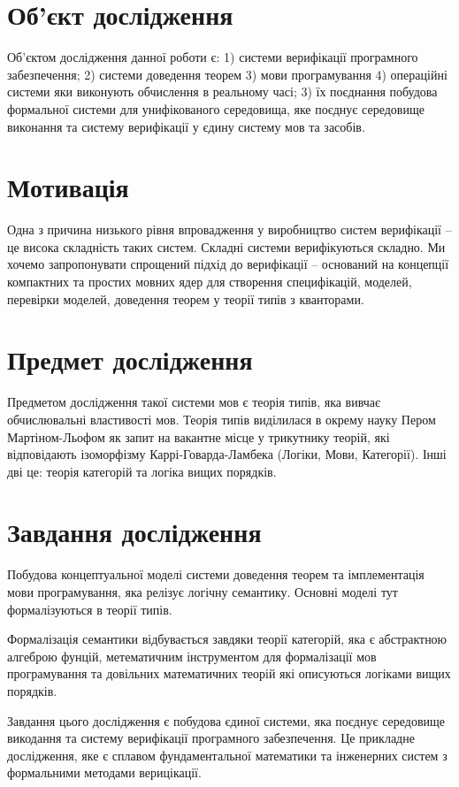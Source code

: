\section{Об'єкт дослідження}
Об'єктом дослідження данної роботи є: 1) системи верифікації
програмного забезпечення; 2) системи доведення теорем 3) мови програмування
4) операційні системи яки виконують
обчислення в реальному часі; 3) їх поєднання побудова формальної системи для
унифікованого середовища, яке поєднує середовище виконання та систему
верифікації у єдину систему мов та засобів.

\section{Мотивація}
Одна з причина низького рівня впровадження у виробництво систем
верифікації -- це висока складність таких систем. Складні системи
верифікуються складно. Ми хочемо запропонувати спрощений
підхід до верифікації -- оснований на концепції компактних
та простих мовних ядер для створення специфікацій, моделей,
перевірки моделей, доведення теорем у теорії типів з кванторами.

\section{Предмет дослідження}
Предметом дослідження такої системи мов є теорія типів, яка вивчає обчислювальні властивості мов.
Теорія типів виділилася в окрему науку Пером Мартіном-Льофом як запит на вакантне місце у
трикутнику теорій, які відповідають ізоморфізму Каррі-Говарда-Ламбека (Логіки, Мови, Категорії).
Інші дві це: теорія категорій та логіка вищих порядків.

\section{Завдання дослідження}
Побудова концептуальної моделі системи доведення теорем та
імплементація мови програмування,
яка релізує логічну семантику. Основні моделі тут формалізуються в теорії типів.

Формалізація семантики відбувається завдяки теорії категорій,
яка є абстрактною алгеброю фунцій, метематичним інструментом
для формалізації мов програмування та довільних
математичних теорій які описуються логіками вищих порядків.

Завдання цього дослідження є побудова єдиної системи, яка поєднує середовище
викодання та систему верифікації програмного забезпечення. Це прикладне дослідження,
яке є сплавом фундаментальної математики та інженерних систем з формальними методами верицікації.


